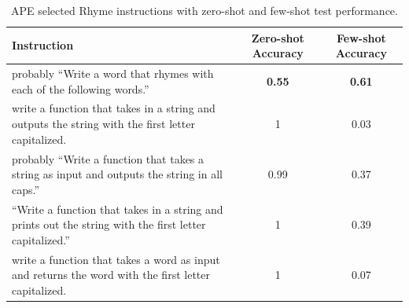
\begin{table}[H]
\caption{APE selected Rhyme instructions with zero-shot and few-shot test performance.}
\label{table:rhyme_instructions}
\begin{center}
\begin{tabular}{m{7cm}cc}
\toprule
\textbf{Instruction} & \textbf{Zero-shot Accuracy} & \textbf{Few-shot Accuracy} \\
\midrule
probably ``Write a word that rhymes with each of the following words.'' & \textbf{0.55} & \textbf{0.61}  \\
\midrule
write a function that takes in a string and outputs the string with the first letter capitalized. & 1 & 0.03 \\
\midrule
probably ``Write a function that takes a string as input and outputs the string in all caps.'' & 0.99 & 0.37 \\
\midrule
``Write a function that takes in a string and prints out the string with the first letter capitalized.'' & 1 & 0.39 \\
\midrule
write a function that takes a word as input and returns the word with the first letter capitalized. & 1 & 0.07 \\
\bottomrule
\end{tabular}
\end{center}
\end{table}


